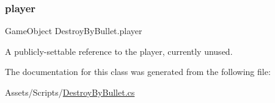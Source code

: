 \subsubsection{\texorpdfstring{player}{player}}
{\footnotesize\ttfamily Game\+Object Destroy\+By\+Bullet.\+player}



A publicly-\/settable reference to the player, currently unused. 



The documentation for this class was generated from the following file\+:\begin{DoxyCompactItemize}
\item 
Assets/\+Scripts/\mbox{\hyperlink{_destroy_by_bullet_8cs}{Destroy\+By\+Bullet.\+cs}}\end{DoxyCompactItemize}
